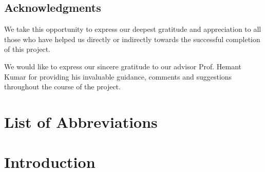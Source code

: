 \documentclass[letterpaper,11pt]{report}
\begin{document}
\newpage
\section*{Acknowledgments}\label{section:acknowledgments}
\pagestyle{plain}
We take this opportunity to express our deepest gratitude and appreciation to all those
who have helped us directly or indirectly towards the successful completion of this project.
\par
We would like to express our sincere gratitude to our advisor Prof. Hemant Kumar for providing his invaluable guidance, comments and suggestions throughout the course of the project.

\vspace{2in}

\newpage
\tableofcontents

\listoffigures
{}

\newpage
{}
\chapter*{List of Abbreviations}
\printacronyms[include-classes=abbrev, heading=none]

\newpage
\chapter{Introduction}\label{chapter:introduction}
\setcounter{page}{1}
\onehalfspacing
\end{document}
